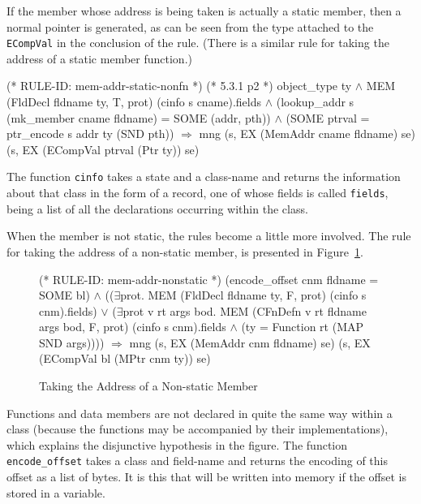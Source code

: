 \documentclass[11pt]{article}
\begin{document}
If the member whose address is being taken is actually a static
member, then a normal pointer is generated, as can be seen from the
type attached to the \texttt{ECompVal} in the conclusion of the rule.
(There is a similar rule for taking the address of a static member
function.)%
%
\begin{stdrule}
(* RULE-ID: mem-addr-static-nonfn *)
(* 5.3.1 p2 *)
     object_type ty \(\land\)
     MEM (FldDecl fldname ty, T, prot)
         (cinfo s cname).fields \(\land\)
     (lookup_addr s (mk_member cname fldname) =
        SOME (addr, pth)) \(\land\)
     (SOME ptrval = ptr_encode s addr ty (SND pth))
   \(\Rightarrow\)
     mng (s, EX (MemAddr cname fldname) se)
         (s, EX (ECompVal ptrval (Ptr ty)) se)
\end{stdrule}
The function \texttt{cinfo} takes a state and a class-name and returns
the information about that class in the form of a record, one of whose
fields is called \texttt{fields}, being a list of all the declarations
occurring within the class.

%
When the member is not static, the rules become a little more
involved.  The rule for taking the address of a non-static member,
 is presented in
Figure~\ref{fig:mem-addr-nonstatic}.
\begin{figure}[hbtp]
%
\begin{stdrule}
(* RULE-ID: mem-addr-nonstatic *)
     (encode_offset cnm fldname = SOME bl) \(\land\)
     ((\(\exists\)prot. MEM (FldDecl fldname ty, F, prot)
                  (cinfo s cnm).fields) \(\lor\)
      (\(\exists\)prot v rt args bod.
          MEM (CFnDefn v rt fldname args bod, F, prot)
              (cinfo s cnm).fields \(\land\)
          (ty = Function rt (MAP SND args))))
   \(\Rightarrow\)
     mng (s, EX (MemAddr cnm fldname) se)
         (s, EX (ECompVal bl (MPtr cnm ty)) se)
\end{stdrule}
\caption{Taking the Address of a Non-static Member}
\label{fig:mem-addr-nonstatic}
\end{figure}
Functions and data members are not declared in quite the same way
within a class (because the functions may be accompanied by their
implementations), which explains the disjunctive hypothesis in the
figure.  The function \texttt{encode_offset} takes a class and
field-name and returns the encoding of this offset as a list of bytes.
It is this that will be written into memory if the offset is stored in
a variable.
\end{document}
